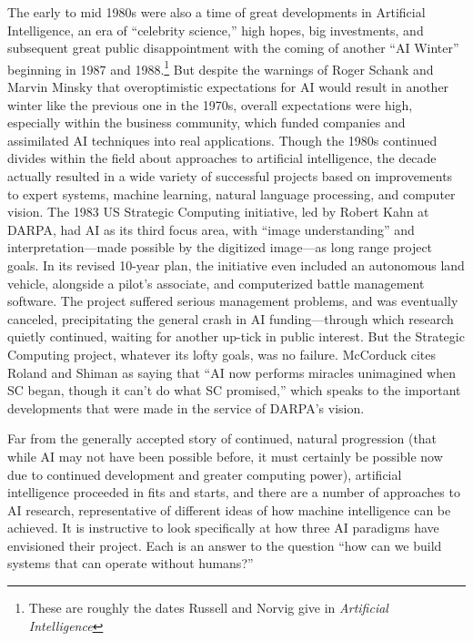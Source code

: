 The early to mid 1980s were also a time of great developments in
Artificial Intelligence, an era of ``celebrity science,'' high hopes,
big investments, and subsequent great public disappointment with the
coming of another ``AI Winter'' beginning in 1987 and
1988.\footnote{These are roughly the dates Russell and Norvig give in
  \emph{Artificial Intelligence}\cite{russellnorvig}} But despite the
warnings of Roger Schank and Marvin Minsky that overoptimistic
expectations for AI would result in another winter like the previous
one in the 1970s, overall expectations were high, especially within
the business community, which funded companies and assimilated AI
techniques into real applications.\cite[Afterword]{mccorduck} Though
the 1980s continued divides 
within the field about approaches to artificial intelligence, the decade
actually resulted in a wide variety of successful projects based on
improvements to expert systems, machine learning, natural language
processing, and computer vision.\cite[Afterword]{mccorduck} The 1983 US Strategic Computing
initiative, led by Robert Kahn at DARPA, had AI as its third focus
area, with ``image understanding'' and interpretation---made possible by
the digitized image---as long range project goals. In its revised
10-year plan, the initiative even included an autonomous land vehicle,
alongside a pilot's associate, and computerized battle management
software. The project suffered serious management problems, and
was eventually canceled, precipitating the general crash in AI
funding---through which research quietly continued, waiting for another
up-tick in public interest. But the Strategic Computing project,
whatever its lofty goals, was no failure. McCorduck cites Roland and
Shiman as saying that ``AI now performs miracles unimagined when SC
began, though it can't do what SC promised,'' which speaks to the
important developments that were made in the service of DARPA's vision.\cite[Afterword]{mccorduck}


Far from the generally accepted story of continued, natural
progression (that while AI may not have been possible before, it must
certainly be possible now due to continued development and greater
computing power), artificial intelligence proceeded in fits and
starts, and there are a number of approaches to AI research,
representative of different
ideas of how machine intelligence can be achieved. It is instructive
to look specifically at how three AI paradigms have envisioned their project.
Each is an answer to the question ``how can we build systems that
can operate without humans?''

